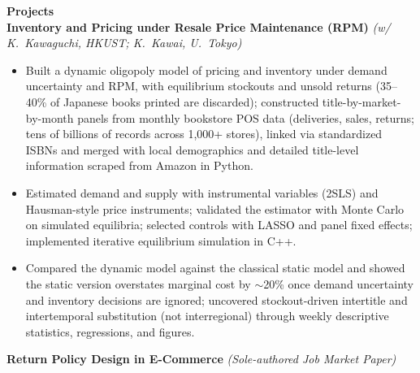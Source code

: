 \documentclass[11pt,letterpaper]{article}
\begin{document}
\vspace{0.15pt}

{\large \textbf{Projects}}\\[-0.5pt]
\textbf{Inventory and Pricing under Resale Price Maintenance (RPM)} \textit{(w/ K.\ Kawaguchi, HKUST; K.\ Kawai, U.\ Tokyo)}\\
\vspace{-6pt}
\begin{itemize}
  \item Built a dynamic oligopoly model of pricing and inventory under demand uncertainty and RPM, with equilibrium stockouts and unsold returns (35--40\% of Japanese books printed are discarded); constructed title-by-market-by-month panels from monthly bookstore POS data (deliveries, sales, returns; tens of billions of records across 1{,}000+ stores), linked via standardized ISBNs and merged with local demographics and detailed title-level information scraped from Amazon in Python.
  \item Estimated demand and supply with instrumental variables (2SLS) and Hausman-style price instruments; validated the estimator with Monte Carlo on simulated equilibria; selected controls with LASSO and panel fixed effects; implemented iterative equilibrium simulation in C++.
  \item Compared the dynamic model against the classical static model and showed the static version overstates marginal cost by \(\sim\)20\% once demand uncertainty and inventory decisions are ignored; uncovered stockout-driven intertitle and intertemporal substitution (not interregional) through weekly descriptive statistics, regressions, and figures.
\end{itemize}
\vspace{-3pt}
\textbf{Return Policy Design in E-Commerce} \textit{(Sole-authored Job Market Paper)}\\
\vspace{-6pt}
\end{document}

